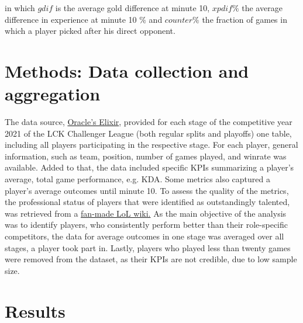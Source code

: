 \documentclass{article}
\begin{document}
in which $gdif$ is the average gold difference at minute 10,
$xpdif\%$ the average difference in experience at minute 10 $\%$ and
$counter\%$ the fraction of games in which a player picked after his direct opponent.


\section{Methods: Data collection and aggregation}


The data source,
\href{https://oracleselixir.com/stats/players/byTournament}{Oracle's Elixir}, provided for each  stage of the competitive year 2021 of the LCK Challenger League (both regular splits and playoffs) one table, including all players participating in the respective stage. For each player, general information, such as team, position, number of games played, and winrate was available. Added to that, the data included specific KPIs summarizing a player's average, total game performance, e.g. KDA. Some metrics also captured a player's average outcomes until minute 10. To assess the quality of the metrics, the professional status of players that were identified as outstandingly talented, was retrieved from a \href{https://lol.fandom.com/wiki/League_of_Legends_Esports_Wiki}{fan-made LoL wiki.}  \newline
As the main objective of the analysis was to identify players, who consistently perform better than their role-specific competitors, the data for average outcomes in one stage was averaged over all stages, a player took part in. Lastly, players who played less than twenty games were removed from the dataset, as their KPIs are not credible, due to low sample size.
\section{Results}
\end{document}
